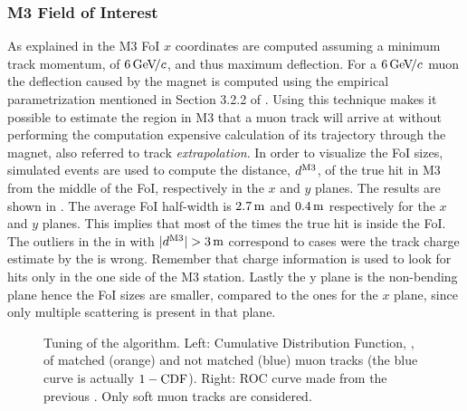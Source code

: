\subsubsection{M3 Field of Interest}
As explained in  the M3 FoI $x$ coordinates are computed assuming a minimum track momentum, of $6{\mathrm{\,Ge\kern -0.1em V\!/}c}$,
and thus maximum deflection. For a $6{\mathrm{\,Ge\kern -0.1em V\!/}c}$ muon the deflection caused by the \lhcb magnet is computed using the empirical
parametrization mentioned in Section 3.2.2 of \cite{roelThesis}. Using this technique makes it possible to estimate the region
in M3 that a muon track will arrive at without performing the computation
expensive calculation of its trajectory through the \lhcb magnet, also referred to track {\it extrapolation}. In order to visualize the FoI sizes,
simulated events are used to compute the distance, $d^{\rm M3}$, of the true hit in M3 from the middle of the FoI, respectively in the $x$ and $y$ planes.
The results are shown in . The average FoI half-width is $2.7\rm \,m$ and $0.4\rm \,m$ respectively for the $x$ and $y$ planes.
This implies that most of the times the true hit is inside the FoI. The outliers in the  in with $|d^{\rm M3}|>3\m$
correspond to cases were the track charge estimate by the \ttracker is wrong. Remember that charge information is used to
look for hits only in the one side of the M3 station. Lastly the y plane is the non-bending plane hence the FoI sizes
are smaller, compared to the ones for the $x$ plane, since only multiple scattering is present in that plane.

\begin{figure}[t]
  \centering
  \begin{subfigure}{0.5\textwidth}
    \raggedright
    \scalebox{0.55}{}
    \caption{}
    \label{mvm_cdf}
  \end{subfigure}%
  \hfill%
  \begin{subfigure}{0.5\textwidth}
    \raggedleft
    \scalebox{0.55}{}
    \caption{}
    \label{mvm_roc}
  \end{subfigure}
  \caption{Tuning of the \mvTTm algorithm. Left: \chisq Cumulative Distribution Function, \cdf,
           of matched (orange) and not matched (blue) muon tracks (the blue curve is actually $1-\mbox{CDF}$).
           Right: ROC curve made from the previous \chisq \cdf. Only soft muon tracks are considered. }
 \label{mvm_tuning}
\end{figure}

